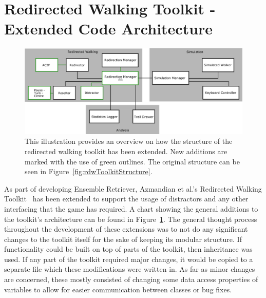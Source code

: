 \section{Redirected Walking Toolkit - Extended Code Architecture}
\begin{figure}[tbph]
    \centering
    \includegraphics[width=1.0\textwidth]{figures/graphs/ToolkitExtension.png}
    \caption[Extended Structure of the Redirected Walking Toolkit]{This illustration provides an overview on how the structure of the redirected walking toolkit has been extended. New additions are marked with the use of green outlines. The original structure can be seen in Figure~\ref{fig:rdwToolkitStructure}.}
    \label{fig:rdwToolkitExtendedStructure}
\end{figure}

As part of developing Ensemble Retriever, Azmandian et al.'s Redirected Walking Toolkit~\cite{azmandian2016redirected} has been extended to support the usage of distractors and any other interfacing that the game has required. A chart showing the general additions to the toolkit's architecture can be found in Figure~\ref{fig:rdwToolkitExtendedStructure}. The general thought process throughout the development of these extensions was to not do any significant changes to the toolkit itself for the sake of keeping its modular structure. If functionality could be built on top of parts of the toolkit, then inheritance was used. If any part of the toolkit required major changes, it would be copied to a separate file which these modifications were written in. As far as minor changes are concerned, these mostly consisted of changing some data access properties of variables to allow for easier communication between classes or bug fixes.

